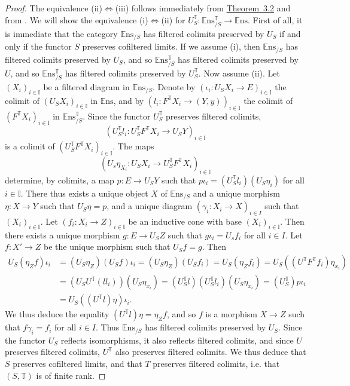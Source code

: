 \documentclass{article}
\newcommand{\bb}[1]{{\mathbb{#1}}}
\newcommand{\Set}{\mathbb{E}\mathrm{ns}}
\newcommand{\oldpage}[1]{\marginpar{\footnotesize$\Big\vert$ \textit{p.~#1}}}
\begin{document}
\begin{proof}
  The equivalence (ii)$\iff$(iii) follows immediately from \hyperref[3.2]{Theorem~3.2} and from \cite[Theorem~4.2]{3}.
  We will show the equivalence (i)$\iff$(ii) for $U_S^\bb{T}\colon\Set_{/S}^\bb{T}\to\Set$.
  First of all, it is immediate that the category $\Set_{/S}$ has filtered colimits preserved by $U_S$ if and only if the functor $S$ preserves cofiltered limits.
  If we assume (i), then $\Set_{/S}$ has filtered colimits preserved by $U_S$, and so $\Set_{/S}^\bb{T}$ has
\oldpage{208}
  filtered colimits preserved by $U$, and so $\Set_{/S}^\bb{T}$ has filtered colimits preserved by $U_S^\bb{T}$.
  Now assume (ii).
  Let $(X_i)_{i\in\bb{I}}$ be a filtered diagram in $\Set_{/S}$.
  Denote by $(\iota_i\colon U_SX_i\to E)_{i\in\bb{I}}$ the colimit of $(U_SX_i)_{i\in\bb{I}}$ in $\Set$, and by $(l_i\colon F^\bb{T}X_i\to(Y,y))_{i\in\bb{I}}$ the colimit of $(F^\bb{T}X_i)_{i\in\bb{I}}$ in $\Set_{/S}^\bb{T}$.
  Since the functor $U_S^\bb{T}$ preserves filtered colimits,
  \[
    (U_S^\bb{T}l_i\colon U_S^\bb{T}F^\bb{T}X_i \to U_SY)_{i\in\bb{I}}
  \]
  is a colimit of $(U_S^\bb{T}F^\bb{T}X_i)_{i\in\bb{I}}$.
  The maps
  \[
    (U_s\eta_{X_i}\colon U_SX_i \to U_S^\bb{T}F^\bb{T}X_i)_{i\in\bb{I}}
  \]
  determine, by colimits, a map $p\colon E\to U_SY$ such that $p\iota_i=(U_S^\bb{T}l_i)(U_S\eta_i)$ for all $i\in\bb{I}$.
  There thus exists a unique object $X$ of $\Set_{/S}$ and a unique morphism $\eta\colon X\to Y$ such that $U_S\eta=p$, and a unique diagram $(\gamma_i\colon X_i\to X)_{i\in I}$ such that $(X_i)_{i\in\bb{I}}$.
  Let $(f_i\colon X_i\to Z)_{i\in\bb{I}}$ be an inductive cone with base $(X_i)_{i\in\bb{I}}$.
  Then there exists a unique morphism $g\colon E\to U_SZ$ such that $g\iota_i=U_sf_i$ for all $i\in I$.
  Let $f\colon X'\to Z$ be the unique morphism such that $U_Sf=g$.
  Then
  \[
    \begin{aligned}
      U_S(\eta_Zf)\iota_i
      &= (U_S\eta_Z)(U_Sf)\iota_i
      = (U_S\eta_Z)(U_Sf_i)
      = U_S(\eta_Zf_i)
      = U_S((U^\bb{T}F^\bb{T}f_i)\eta_{x_i})
    \\&= (U_SU^\bb{T}(ll_i))(U_S\eta_{x_i})
      = (U_S^\bb{T}l)(U_S^\bb{T}l_i)(U_S\eta_{x_i})
      = (U_S^\bb{T})p\iota_i
    \\&= U_S((U^\bb{T}l)\eta)\iota_i.
    \end{aligned}
  \]
  We thus deduce the equality $(U^\bb{T}l)\eta=\eta_Zf$, and so $f$ is a morphism $X\to Z$ such that $f\gamma_i=f_i$ for all $i\in I$.
  Thus $\Set_{/S}$ has filtered colimits preserved by $U_S$.
  Since the functor $U_S$ reflects isomorphisms, it also reflects filtered colimits, and since $U$ preserves filtered colimits, $U^\bb{T}$ also preserves filtered colimits.
  We thus deduce that $S$ preserves cofiltered limits, and that $T$ preserves filtered colimits, i.e. that $(S,\bb{T})$ is of finite rank.
\end{proof}
\end{document}
